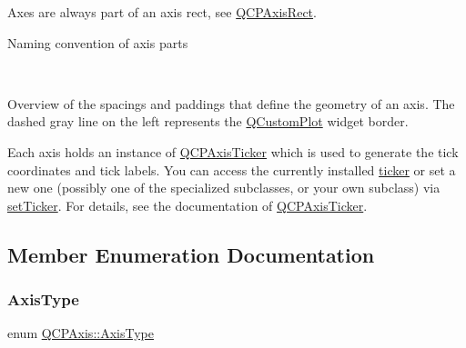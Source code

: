 Axes are always part of an axis rect, see \hyperlink{class_q_c_p_axis_rect}{Q\+C\+P\+Axis\+Rect}.  \begin{center}Naming convention of axis parts\end{center}  ~\newline
  \begin{center}Overview of the spacings and paddings that define the geometry of an axis. The dashed gray line on the left represents the \hyperlink{class_q_custom_plot}{Q\+Custom\+Plot} widget border.\end{center} 

Each axis holds an instance of \hyperlink{class_q_c_p_axis_ticker}{Q\+C\+P\+Axis\+Ticker} which is used to generate the tick coordinates and tick labels. You can access the currently installed \hyperlink{class_q_c_p_axis_a7b7a27151be8235059e1294f73ecf615}{ticker} or set a new one (possibly one of the specialized subclasses, or your own subclass) via \hyperlink{class_q_c_p_axis_a4ee03fcd2c74d05cd1a419b9af5cfbdc}{set\+Ticker}. For details, see the documentation of \hyperlink{class_q_c_p_axis_ticker}{Q\+C\+P\+Axis\+Ticker}. 

\subsection{Member Enumeration Documentation}
\mbox{\label{class_q_c_p_axis_ae2bcc1728b382f10f064612b368bc18a}} 
\subsubsection{\texorpdfstring{Axis\+Type}{AxisType}}
{\footnotesize\ttfamily enum \hyperlink{class_q_c_p_axis_ae2bcc1728b382f10f064612b368bc18a}{Q\+C\+P\+Axis\+::\+Axis\+Type}}

